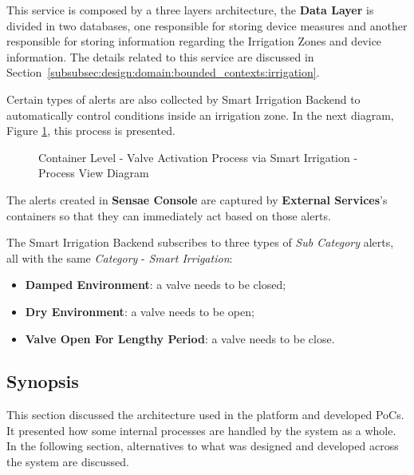 This service is composed by a three layers architecture, the \textbf{Data Layer} is divided in two databases, one responsible for storing device measures and another responsible for storing information regarding the Irrigation Zones and device information. The details related to this service are discussed in Section~\ref{subsubsec:design:domain:bounded_contexts:irrigation}.

Certain types of alerts are also collected by Smart Irrigation Backend to automatically control conditions inside an irrigation zone. In the next diagram, Figure \ref{fig:design:architecture:container:process:diagram:irrigation}, this process is presented.

\begin{figure}[H]
   \centering
   \resizebox{\columnwidth}{!}
   {
      
   }
   \caption[Container Level - Valve Activation Process via Smart Irrigation - Process View Diagram]{Container Level - Valve Activation Process via Smart Irrigation - Process View Diagram}
   \label{fig:design:architecture:container:process:diagram:irrigation}
\end{figure}

The alerts created in \textbf{Sensae Console} are captured by \textbf{External Services}'s containers so that they can immediately act based on those alerts.

The Smart Irrigation Backend subscribes to three types of \textit{Sub Category} alerts, all with the same \textit{Category} - \textit{Smart Irrigation}:

\begin{itemize}
   \item \textbf{Damped Environment}: a valve needs to be closed;
   \item \textbf{Dry Environment}: a valve needs to be open;
   \item \textbf{Valve Open For Lengthy Period}: a valve needs to be close.
\end{itemize}

\subsection{Synopsis}
\label{subsubsec:design:architecture:synopsis}

This section discussed the architecture used in the platform and developed \gls{PoC}s. It presented how some internal processes are handled by the system as a whole.
In the following section, alternatives to what was designed and developed across the system are discussed.

